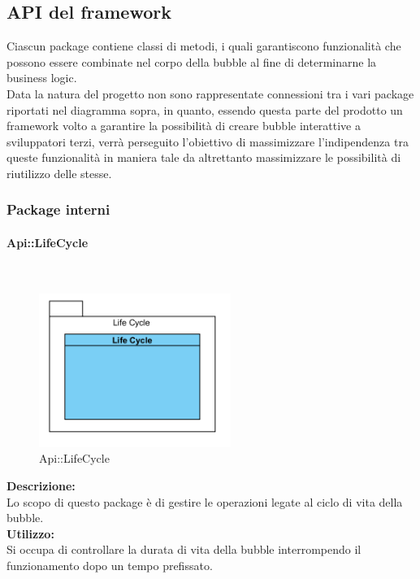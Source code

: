 \subsection{API del framework}
Ciascun package contiene classi di metodi, i quali garantiscono funzionalità che possono essere combinate nel corpo della bubble al fine di determinarne la business logic.\\
Data la natura del progetto non sono rappresentate connessioni tra i vari package riportati nel diagramma sopra, in quanto, essendo questa parte del prodotto un framework volto a garantire la possibilità di creare bubble interattive a sviluppatori terzi, verrà perseguito l'obiettivo di massimizzare l'indipendenza tra queste funzionalità in maniera tale da altrettanto massimizzare le possibilità di riutilizzo delle stesse.

\subsubsection{Package interni}

\begin{samepage}
\paragraph{Api\-::Life\-Cycle}\label{api-ciclovita}\mbox{}\\
\nopagebreak
\begin{figure}[H]
	\centering
	\includegraphics[height=5cm]{diagrammi_img/classi_e_package/api_vitabolla.png}
	\caption{Api\-::Life\-Cycle}
\end{figure}
\end{samepage}
\textbf{Descrizione:}\\ 
Lo scopo di questo package è di gestire le operazioni legate al ciclo di vita della bubble.\\
\textbf{Utilizzo:}\\
Si occupa di controllare la durata di vita della bubble interrompendo il funzionamento dopo un tempo prefissato.\\

